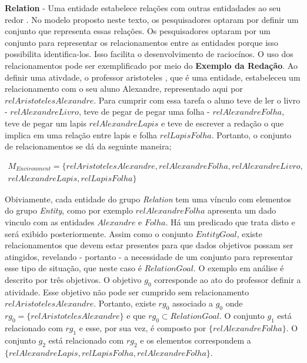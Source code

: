 \textbf{Relation} - Uma entidade estabelece relações com outras entidadades ao seu redor \cite{entity}. No modelo proposto neste texto, 
os pesquisadores optaram por definir um conjunto que representa essas relações. Os pesquisadores optaram por um conjunto para representar
os relacionamentos entre as entidades porque isso possibilita identifica-los. Isso facilita o desenvolvimento de raciocínos. O uso 
dos relacionamentos pode ser exemplificado por meio do \textbf{Exemplo da Redação}. Ao definir uma ativdade, o professor aristoteles
, que é uma entidade, estabeleceu um relacionamento com o seu aluno Alexandre, representado aqui por $relAristotelesAlexandre$. 
Para cumprir com essa tarefa o aluno teve de ler o livro - $relAlexandreLivro$, teve de pegar de pegar uma folha - $relAlexandreFolha$,
teve de pegar um lapis $relAlexandreLapis$ e teve de escrever a redação o que implica em uma relação entre lapis e folha $relLapisFolha$. 
Portanto, o conjunto de relacionamentos se dá da seguinte maneira;

\begin{eqnarray}\label{Environment}\nonumber
    M_{Environment} = \{ relAristotelesAlexandre, relAlexandreFolha, relAlexandreLivro, \\ \nonumber
     relAlexandreLapis, relLapisFolha \}
\end{eqnarray}

Obiviamente, cada entidade do grupo \textit{Relation} tem uma vínculo com elementos do grupo \textit{Entity}, como por exemplo 
$relAlexandreFolha$ apresenta um dado vinculo com as entidades $Alexandre$ e $Folha$. Há um predicado que trata disto e será
exibido posteriormente. Assim como o conjunto $EntityGoal$, existe relacionamentos que devem estar presentes para que dados 
objetivos possam ser atingidos, revelando - portanto - a necessidade de um conjunto para representar esse tipo de situação, 
que neste caso é $RelationGoal$. O exemplo em análise é descrito por três objetivos. O objetivo $g_0$ corresponde ao ato 
do professor definir a atividade. Esse objetivo não pode ser cumprido sem relacionamento $relAristotelesAlexandre$. 
Portanto, existe $rg_0$ associado a $g_0$ onde $rg_0 = \{ relAristotelesAlexandre \}$ e que $rg_0 \subset RelationGoal$. 
O conjunto $g_1$ está relacionado com $rg_1$ e esse, por sua vez, é composto por $\{ relAlexandreFolha\}$. O conjunto $g_2$ 
está relacionado com $rg_2$ e os elementos correspondem a $\{ relAlexandreLapis, relLapisFolha, relAlexandreFolha\}$.

